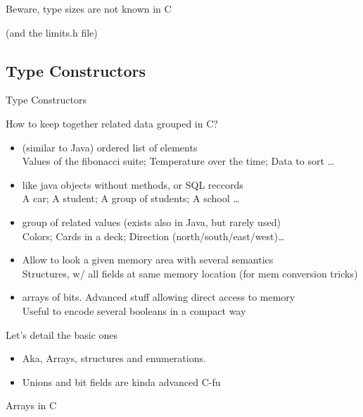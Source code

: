 \begin{Coupe}
\begin{frame}{Beware, type sizes are not known in C}
  \bigskip

  (and the limits.h file)
\end{frame}
\subsection{Type Constructors}\subtoc 
\begin{frame}{Type Constructors}
  \begin{block}{How to keep together related data grouped in C?}
    \begin{itemize}
    \item {} (similar to Java) ordered list of elements\\
      {\small{} Values of the fibonacci suite; Temperature over the time;
      Data to sort \ldots}
    \item {} like java objects without methods, or SQL
      reccords\\
      {\small{} A car; A student; A group of students; A school \ldots}
    \item {} group of related values (exists also in
      Java, but rarely used)\\
      {\small{} Colors; Cards in a deck; Direction
      (north/south/east/west)\ldots}
      \medskip
    \item {} Allow to look a given memory area with
      several semantics\\
      {\small Structures, w/ all fields at same memory
        location (for mem conversion tricks)}
    \item {} arrays of bits. Advanced stuff allowing
      direct access to memory\\
      {\small Useful to encode several booleans in a compact way}
    \end{itemize}
  \end{block}
  \begin{block}{Let's detail the basic ones}
    \begin{itemize}
    \item Aka, Arrays, structures and enumerations.
    \item Unions and bit fields are kinda advanced C-fu
    \end{itemize}
  \end{block}
\end{frame}
\begin{frame}{Arrays in C}


\end{frame}
\end{Coupe}
